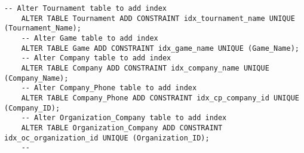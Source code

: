 \begin{lstlisting}[caption={Alter Table},label={lst:alter-table}]
    -- Alter Tournament table to add index
    ALTER TABLE Tournament ADD CONSTRAINT idx_tournament_name UNIQUE (Tournament_Name);
    -- Alter Game table to add index
    ALTER TABLE Game ADD CONSTRAINT idx_game_name UNIQUE (Game_Name);
    -- Alter Company table to add index
    ALTER TABLE Company ADD CONSTRAINT idx_company_name UNIQUE (Company_Name);
    -- Alter Company_Phone table to add index
    ALTER TABLE Company_Phone ADD CONSTRAINT idx_cp_company_id UNIQUE (Company_ID);
    -- Alter Organization_Company table to add index
    ALTER TABLE Organization_Company ADD CONSTRAINT idx_oc_organization_id UNIQUE (Organization_ID);
    --
\end{lstlisting}

\clearpage
